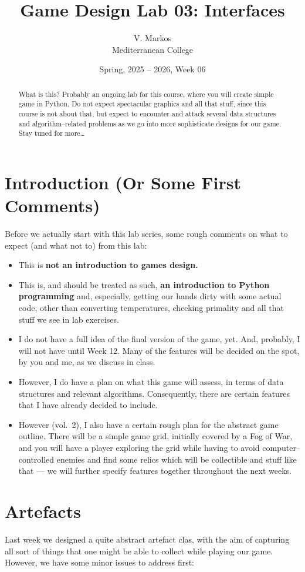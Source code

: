 \documentclass[a4paper, 11pt]{article}
\title{Game Design Lab 03: Interfaces}
\author{V. Markos\\Mediterranean College}
\date{Spring, 2025 -- 2026, Week 06}
\numberwithin{equation}{section}
\theoremstyle{definition}
\begin{document}
%
\maketitle
%
\begin{abstract}
    What is this? Probably an ongoing lab for this course, where you will create simple game in Python. Do not expect spectacular graphics and all that stuff, since this course is not about that, but expect to encounter and attack several data structures and algorithm--related problems as we go into more sophisticate designs for our game. Stay tuned for more\ldots
\end{abstract}
%
%
%
\section{Introduction (Or Some First Comments)}
%
Before we actually start with this lab series, some rough comments on what to expect (and what not to) from this lab:
\begin{itemize}
    \item This is \textbf{not an introduction to games design.}
    \item This is, and should be treated as such, \textbf{an introduction to Python programming} and, especially, getting our hands dirty with some actual code, other than converting temperatures, checking primality and all that stuff we see in lab exercises.
    \item I do not have a full idea of the final version of the game, yet. And, probably, I will not have until Week 12. Many of the features will be decided on the spot, by you and me, as we discuss in class.
    \item However, I do have a plan on what this game will assess, in terms of data structures and relevant algorithms. Consequently, there are certain features that I have already decided to include.
    \item However (vol.~2), I also have a certain rough plan for the abstract game outline. There will be a simple game grid, initially covered by a Fog of War, and you will have a player exploring the grid while having to avoid computer--controlled enemies and find some relics which will be collectible and stuff like that --- we will further specify features together throughout the next weeks.
\end{itemize}
%
%
%
\section{Artefacts}
%
Last week we designed a quite abstract artefact clas, with the aim of capturing all sort of things that one might be able to collect while playing our game. However, we have some minor issues to address first:
\end{document}
